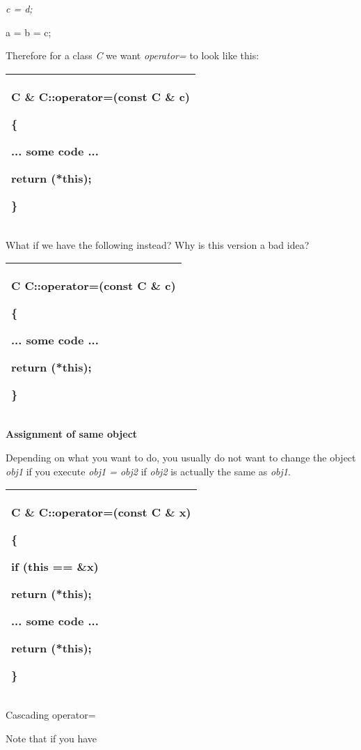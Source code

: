 \documentclass[
]{article}
\begin{document}
\emph{c = d;}

a = b = c;

Therefore for a class \emph{C} we want \emph{operator=} to look like
this:

\begin{longtable}[]{@{}l@{}}
\toprule
\endhead
\begin{minipage}[t]{0.97\columnwidth}\raggedright
C \& C::operator=(const C \& c)

\{

... some code ...

return (*this);

\}\strut
\end{minipage}\tabularnewline
\bottomrule
\end{longtable}

What if we have the following instead? Why is this version a bad idea?

\begin{longtable}[]{@{}l@{}}
\toprule
\endhead
\begin{minipage}[t]{0.97\columnwidth}\raggedright
C C::operator=(const C \& c)

\{

... some code ...

return (*this);

\}\strut
\end{minipage}\tabularnewline
\bottomrule
\end{longtable}

\textbf{Assignment of same object}

Depending on what you want to do, you usually do not want to change the
object \emph{obj1} if you execute \emph{obj1 = obj2} if \emph{obj2} is
actually the same as \emph{obj1}.

\begin{longtable}[]{@{}l@{}}
\toprule
\endhead
\begin{minipage}[t]{0.97\columnwidth}\raggedright
C \& C::operator=(const C \& x)

\{

if (this == \&x)

return (*this);

... some code ...

return (*this);

\}\strut
\end{minipage}\tabularnewline
\bottomrule
\end{longtable}

Cascading operator=

Note that if you have
\end{document}
